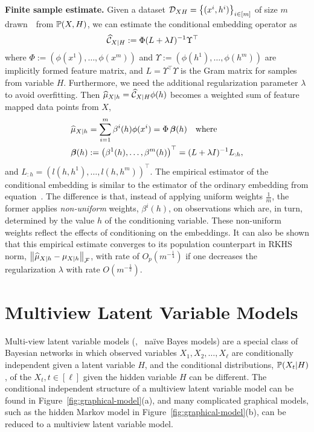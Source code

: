 \documentclass[11pt]{article}
\newcommand{\hmu}{\widehat{\mu}}
\begin{document}
{\bf Finite sample estimate.} Given a dataset $\mathcal{D}_{XH}=\left\{(x^i,h^i)\right\}_{i\in[m]}$ of size $m$ drawn~\iid~from $\mathbb{P}(X,H)$, we can estimate the conditional embedding operator as
\begin{align}
    & \widehat{\mathcal{C}}_{X|H} := \Phi (L + \lambda I)^{-1} \Upsilon^\top  \label{eq:embeddingoperatorestimator}
\end{align}
where $\Phi:=(\phi(x^1),\ldots,\phi(x^m))$ and $\Upsilon:=(\phi(h^1),\ldots,\phi(h^m))$ are implicitly formed feature matrix, and $L=\Upsilon^\top \Upsilon$ is the Gram matrix for samples from variable $H$. Furthermore, we need the additional regularization parameter $\lambda$ to avoid overfitting. Then $\hmu_{X|h}=\widehat{\Ccal}_{X|H}\phi(h)$ becomes a weighted sum of feature mapped data points from $X$,
\begin{align}
    & \hmu_{X|h} = \sum_{i=1}^m \beta^i(h) \phi(x^i) = \Phi\, \betab(h) \quad \text{where} \,  \label{eq:conditionalembeddingestimator}\\
    & \betab(h) := \rbr{\beta^1(h), \ldots, \beta^m(h)}^\top = (L + \lambda I)^{-1} L_{: h}, \nonumber
\end{align}
and $L_{: h}=(l(h,h^1),\ldots,l(h,h^m))^\top$.
The empirical estimator of the conditional embedding
is similar to the estimator of the ordinary embedding from
equation~. The difference
is that, instead of applying uniform weights $\frac{1}{m}$,
the former applies {\em non-uniform} weights, $\beta^i(h)$, on
observations which are, in turn, determined by the value $h$ of the conditioning
variable. These non-uniform weights reflect the effects of
conditioning on the embeddings. It can also be shown that this empirical estimate converges to its population counterpart in RKHS norm, $\nbr{\hmu_{X|h} - \mu_{X|h}}_{\Fcal}$, with rate of $O_p(m^{-\frac{1}{4}})$ if one decreases the regularization $\lambda$ with rate $O(m^{-\frac{1}{2}})$.

\section{Multiview Latent Variable Models}

Multi-view latent variable models (\eg, \, na\"ive Bayes models) are a
special class of Bayesian networks in which observed variables $X_1, X_2,
\ldots, X_\ell$ are conditionally independent given a latent variable $H$, and
the conditional distributions, $\mathbb{P}(X_t|H)$, of the $X_t, t \in [\ell]$ given the hidden variable $H$ can be different. The conditional independent structure of a multiview latent variable model can be found in Figure~\ref{fig:graphical-model}(a), and many complicated graphical models, such as the hidden Markov model in Figure~\ref{fig:graphical-model}(b), can be reduced to a multiview latent variable model.
\end{document}
